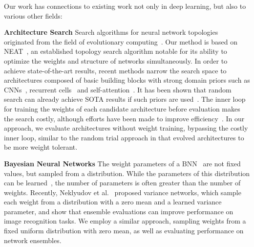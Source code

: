 
Our work has connections to existing work not only in deep learning, but also to various other fields:

\textbf{Architecture Search}\: Search algorithms for neural network topologies originated from the field of evolutionary computing~\cite{turing1948intelligent,harp1990designing,dasgupta1992designing,fullmer1992using,gruau1996comparison,krishnan1994delta,braun1993evolving,mandischer1993representation,zhang1993evolving,maniezzo1994genetic,angeline1994evolutionary,lee1996evolutionary,opitz1997connectionist,pujol1998evolving,yao1998towards}. Our method is based on NEAT~\cite{neat}, an established topology search algorithm notable for its ability to optimize the weights and structure of networks simultaneously. In order to achieve state-of-the-art results, recent methods narrow the search space to architectures composed of basic building blocks with strong domain priors such as CNNs~\cite{zoph2016neural,real2017large,liu2017hierarchical,miikkulainen2019evolving}, recurrent cells~\cite{jozefowicz2015empirical,zoph2016neural,miikkulainen2019evolving} and self-attention~\cite{so2019evolved}. It has been shown that random search can already achieve SOTA results if such priors are used~\cite{li2019random,sciuto2019evaluating,real2018regularized}. The inner loop for training the weights of each candidate architecture before evaluation makes the search costly, although efforts have been made to improve efficiency~\cite{pham2018efficient,brock2017smash,liu2018darts}. In our approach, we evaluate architectures without weight training, bypassing the costly inner loop,
%
similar to the random trial approach in \cite{hinton1996learning,smith1987learning} that evolved architectures to be more weight tolerant.

\textbf{Bayesian Neural Networks}\: The weight parameters of a BNN~\cite{mackay1992bayesian,hinton1993keeping,barber1998ensemble,bishop2006pattern,neal2012bayesian,gal2016uncertainty} are not fixed values, but sampled from a distribution. While the parameters of this distribution can be learned~\cite{hanson1990meiosis,hanson1990stochastic,graves2011practical,krueger2017bayesian}, the number of parameters is often greater than the number of weights. Recently, Neklyudov et al.~\cite{neklyudov2018variance} proposed variance networks, which sample each weight from a distribution with a zero mean and a learned variance parameter, and show that ensemble evaluations can improve performance on image recognition tasks. We employ a similar approach, sampling weights from a fixed uniform distribution with zero mean, as well as evaluating performance on network ensembles.

